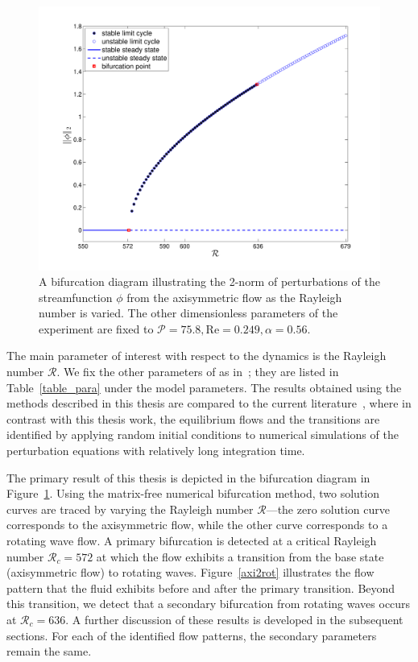 \begin{figure}[t]
\centerline{\includegraphics[width = .9\textwidth]{./figures/Pictures/Bifurcation_Diagram.pdf}}
\caption{A bifurcation diagram illustrating the 2-norm of perturbations of the streamfunction $\phi$ from the axisymmetric flow as the Rayleigh number is varied.  The other dimensionless parameters of the experiment are fixed to  $\mathcal{P} = 75.8, \mathrm{Re} = 0.249, \alpha = 0.56$. }
\label{bif_diag}
\end{figure}

The main parameter of interest with respect to the dynamics is the Rayleigh number $\mathcal{R}$. We fix the other parameters of as in~\cite{PeiChunTsain}; they are listed in Table~\ref{table_para} under the model parameters.
The results obtained using the methods described in this thesis are compared to the current literature~\cite{DNSSAE,PeiChunTsain}, where in contrast with this thesis work, the equilibrium flows and the transitions are identified by applying random initial conditions to numerical simulations of the perturbation equations with relatively long integration time.

The primary result of this thesis is depicted in the bifurcation diagram in Figure~\ref{bif_diag}. Using the matrix-free numerical bifurcation method, two solution curves are traced by varying the Rayleigh number $\mathcal{R}$---the zero solution curve corresponds to the axisymmetric flow, while the other curve corresponds to a rotating wave flow. A primary bifurcation is detected at a critical Rayleigh number $\mathcal{R}_c = 572$ at which the flow exhibits a transition from the base state (axisymmetric flow) to rotating waves. Figure~\ref{axi2rot} illustrates the flow pattern that the fluid exhibits before and after the primary transition.
Beyond this transition, we detect that a secondary bifurcation from rotating waves occurs at $\mathcal{R}_c = 636$. A further discussion of these results is developed in the subsequent sections. For each of the identified flow patterns, the secondary parameters remain the same.

